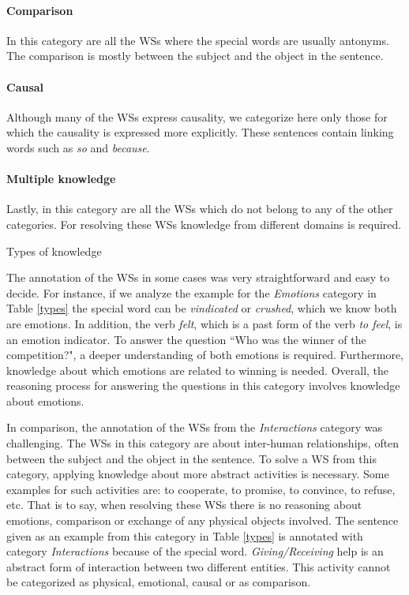 \paragraph{Comparison} In this category are all the WSs where the special words are usually antonyms. The comparison is mostly between the subject and the object in the sentence. 

\paragraph{Causal} Although many of the WSs express causality, we categorize here only those for which the causality is expressed more explicitly. These sentences contain linking words such as \textit{so} and \textit{because}.

\paragraph{Multiple knowledge} Lastly, in this category are all the WSs which do not belong to any of the other categories. For resolving these WSs knowledge from different domains is required.

\begin{table} [h!]
	 
	\caption{{\label{types}}Types of knowledge}
\end{table}

The annotation of the WSs in some cases was very straightforward and easy to decide. For instance, if we analyze the example for the \textit{Emotions} category in Table \ref{types} the special word can be \textit{vindicated} or \textit{crushed}, which we know both are emotions. In addition, the verb \textit{felt}, which is a past form of the verb \textit{to feel}, is an emotion indicator. To answer the question ``Who was the winner of the competition?", a deeper understanding of both emotions is required. Furthermore, knowledge about which emotions are related to winning is needed. 
Overall, the reasoning process for answering the questions in this category involves knowledge about emotions. 

In comparison, the annotation of the WSs from the \textit{Interactions} category was challenging. The WSs in this category are about inter-human relationships, often between the subject and the object in the sentence. 
To solve a WS from this category, applying knowledge about more abstract activities is necessary. Some examples for such activities are: to cooperate, to promise, to convince, to refuse, etc. That is to say, when resolving these WSs there is no reasoning about emotions, comparison or exchange of any physical objects involved.  
The sentence given as an example from this category in Table \ref{types} is annotated with category \textit{Interactions} because of the special word. \textit{Giving/Receiving} help is an abstract form of interaction between two different entities. This activity cannot be categorized as physical, emotional, causal or as comparison.

